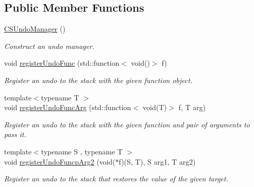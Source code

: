 \subsection*{Public Member Functions}
\begin{DoxyCompactItemize}
\item 
\mbox{\label{classCSUndoManager_a8195893d40647952225158b9bc883ac8}} 
\hyperlink{classCSUndoManager_a8195893d40647952225158b9bc883ac8}{C\+S\+Undo\+Manager} ()
\begin{DoxyCompactList}\small\item\em Construct an undo manager. \end{DoxyCompactList}\item 
void \hyperlink{classCSUndoManager_af8b0d7f2acb9d6686cd030e1cef1640e}{register\+Undo\+Func} (std\+::function$<$ void()$>$ f)
\begin{DoxyCompactList}\small\item\em Register an undo to the stack with the given function object. \end{DoxyCompactList}\item 
\mbox{\label{classCSUndoManager_a35d72c80c1aefbd08592a866ea18f0da}} 
{\footnotesize template$<$typename T $>$ }\\void \hyperlink{classCSUndoManager_a35d72c80c1aefbd08592a866ea18f0da}{register\+Undo\+Func\+Arg} (std\+::function$<$ void(T)$>$ f, T arg)
\begin{DoxyCompactList}\small\item\em Register an undo to the stack with the given function and pair of arguments to pass it. \end{DoxyCompactList}\item 
\mbox{\label{classCSUndoManager_af5412c615c1bb86d6e6657bab1e2175e}} 
{\footnotesize template$<$typename S , typename T $>$ }\\void \hyperlink{classCSUndoManager_af5412c615c1bb86d6e6657bab1e2175e}{register\+Undo\+Funcp\+Arg2} (void($\ast$f)(S, T), S arg1, T arg2)
\begin{DoxyCompactList}\small\item\em Register an undo to the stack that restores the value of the given target. \end{DoxyCompactList}\item 
\mbox{\label{classCSUndoManager_a7bb75a1243d60c291e6c1a6cc5d5f6a7}} 

\end{DoxyCompactItemize}
